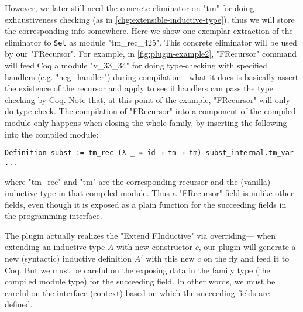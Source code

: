 However, we later still need the concrete eliminator on "tm" for doing
exhaustiveness checking (as in \ref{chg:extensible-inductive-type}),
thus we will store the corresponding info somewhere.  Here we show one
exemplar extraction of the eliminator to \texttt{Set} as module
"tm_rec_425". This concrete eliminator will be used by our "FRecursor".
For example, in \cref{fig:plugin-example2}, "FRecursor" command will
feed Coq a module "v_33_34" for doing type-checking with specified
handlers (e.g. "neg_handler") during compilation---what it does is
basically
assert the existence of the recursor and apply to see if handlers can
pass the type checking by Coq.
Note that, at this point of the example,
"FRecursor" will only do type check. The compilation of "FRecursor" into
a component of the compiled module only happens when closing the whole
family, by inserting the following into the compiled module: 
\begin{verbatim}
Definition subst := tm_rec (λ _ ⇒ id → tm → tm) subst_internal.tm_var ...
\end{verbatim}
where "tm_rec" and "tm" are the corresponding recursor and
the (vanilla) inductive type in that compiled module. Thus a "FRecursor"
field is unlike other fields, even though it is exposed as a plain
function for the succeeding fields in the programming interface.

The plugin actually realizes the "Extend FInductive" via overriding---%
when extending an inductive type $A$ with new constructor $c$, our
plugin will generate a new (syntactic) inductive definition $A'$ with
this new $c$ on the fly and feed it to Coq. But we must be careful on
the exposing data in the family type (the compiled module type) for the
succeeding field. In other words, we must be careful on the interface
(context) based on which the succeeding fields are defined. 

